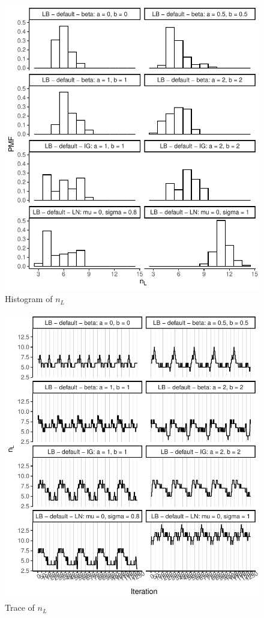 \documentclass{amsart}
\begin{document}
\begin{figure}[ht]
	\centering
	\includegraphics[width=0.95\linewidth]{hist_nl_1.pdf}
	\caption{Histogram of $n_L$}
	\label{fig:hist:nl:1}
\end{figure}

\begin{figure}[ht]
	\centering
	\includegraphics[width=0.95\linewidth]{trace_nl_1.pdf}
	\caption{Trace of $n_L$}
	\label{fig:trace:nl:1}
\end{figure}
\end{document}
